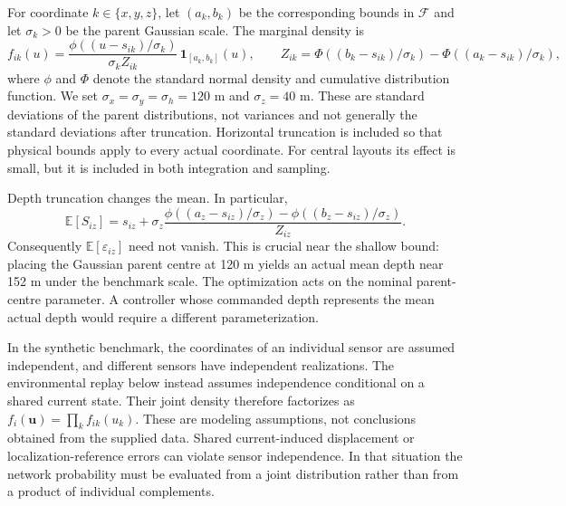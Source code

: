 \documentclass[fleqn,10pt]{wlscirep}
\newcommand{\E}{\mathbb{E}}
\begin{document}
For coordinate $k\in\{x,y,z\}$, let $(a_k,b_k)$ be the corresponding bounds in $\mathcal F$ and let $\sigma_k>0$ be the parent Gaussian scale. The marginal density is
\begin{equation}\label{eq:density}
 f_{ik}(u)=\frac{\phi((u-s_{ik})/\sigma_k)}{\sigma_k Z_{ik}}\,\mathbf 1_{[a_k,b_k]}(u),
 \qquad Z_{ik}=\Phi((b_k-s_{ik})/\sigma_k)-\Phi((a_k-s_{ik})/\sigma_k),
\end{equation}
where $\phi$ and $\Phi$ denote the standard normal density and cumulative distribution function. We set $\sigma_x=\sigma_y=\sigma_h=120$ m and $\sigma_z=40$ m. These are standard deviations of the parent distributions, not variances and not generally the standard deviations after truncation. Horizontal truncation is included so that physical bounds apply to every actual coordinate. For central layouts its effect is small, but it is included in both integration and sampling.

Depth truncation changes the mean. In particular,
\begin{equation}\label{eq:mean}
\E[S_{iz}]=s_{iz}+\sigma_z\frac{\phi((a_z-s_{iz})/\sigma_z)-\phi((b_z-s_{iz})/\sigma_z)}{Z_{iz}}.
\end{equation}
Consequently $\E[\varepsilon_{iz}]$ need not vanish. This is crucial near the shallow bound: placing the Gaussian parent centre at 120 m yields an actual mean depth near 152 m under the benchmark scale. The optimization acts on the nominal parent-centre parameter. A controller whose commanded depth represents the mean actual depth would require a different parameterization.

In the synthetic benchmark, the coordinates of an individual sensor are assumed independent, and different sensors have independent realizations. The environmental replay below instead assumes independence conditional on a shared current state. Their joint density therefore factorizes as $f_i(\mathbf u)=\prod_k f_{ik}(u_k)$\cite{papoulis2002}. These are modeling assumptions, not conclusions obtained from the supplied data. Shared current-induced displacement or localization-reference errors can violate sensor independence. In that situation the network probability must be evaluated from a joint distribution rather than from a product of individual complements.
\end{document}
